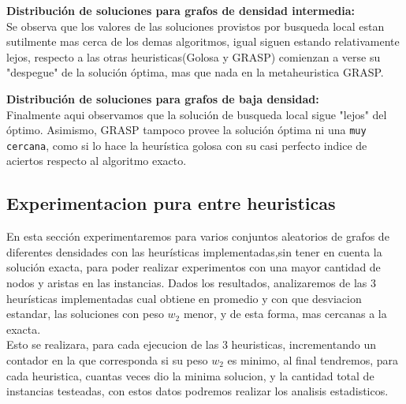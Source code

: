 \vspace{0.5cm}
\textbf{Distribuci\'on de soluciones para grafos de densidad intermedia:}\\
Se observa que los valores de las soluciones provistos por busqueda local estan sutilmente mas cerca de los demas algoritmos, igual siguen estando relativamente lejos, respecto a las otras heuristicas(Golosa y GRASP) comienzan a verse su "despegue" de la soluci\'on \'optima, mas que nada en la metaheuristica GRASP.

\vspace{0.5cm}
\textbf{Distribuci\'on de soluciones para grafos de baja densidad:}\\
Finalmente aqui observamos que la soluci\'on de busqueda local sigue "lejos" del \'optimo. Asimismo, GRASP tampoco provee la soluci\'on \'optima ni una \texttt{muy cercana}, como si lo hace la heur\'istica golosa con su casi perfecto indice de aciertos respecto al algoritmo exacto.

\subsection{Experimentacion pura entre heuristicas}
En esta secci\'on experimentaremos para varios conjuntos aleatorios de grafos de diferentes densidades con las heur\'isticas implementadas,sin tener en cuenta la soluci\'on exacta, para poder realizar experimentos con una mayor cantidad de nodos y aristas en las instancias. Dados los resultados, analizaremos de las 3 heur\'isticas implementadas cual obtiene en promedio y con que desviacion estandar, las soluciones con peso $w_2$ menor, y de esta forma, mas cercanas a la exacta.\\

Esto se realizara, para cada ejecucion de las 3 heuristicas, incrementando un contador en la que corresponda si su peso $w_2$ es minimo, al final tendremos, para cada heuristica, cuantas veces dio la minima solucion, y la cantidad total de instancias testeadas, con estos datos podremos realizar los analisis estadisticos.